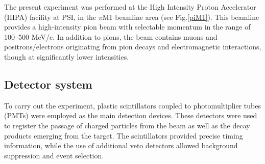 \documentclass[11pt,a4paper]{article}
\begin{document}
The present experiment was performed at the High Intensity Proton Accelerator (HIPA) facility at PSI, in the $\pi$M1 beamline area (see Fig.\ref{piM1}). This beamline provides a high-intensity pion beam with selectable momentum in the range of 100–500 MeV/c. In addition to pions, the beam contains muons and positrons/electrons originating from pion decays and electromagnetic interactions, though at significantly lower intensities.



\subsection{Detector system} 
To carry out the experiment, plastic scintillators coupled to photomultiplier tubes (PMTs) were employed as the main detection devices. These detectors were used to register the passage of charged particles from the beam as well as the decay products emerging from the target. The scintillators provided precise timing information, while the use of additional veto detectors allowed background suppression and event selection.
\end{document}
